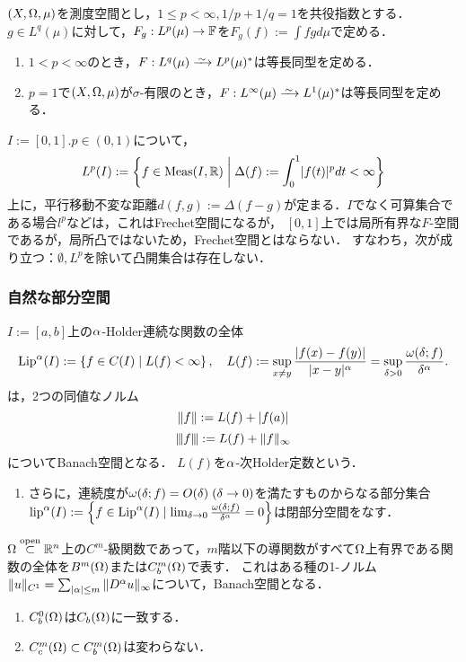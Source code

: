 \documentclass[uplatex,dvipdfmx]{jsreport}
\begin{document}
\begin{theorem}[$L^p$空間の描像]\label{thm-Lp-of-dual-spaces}
    $(X,\Omega,\mu)$を測度空間とし，$1\le p<\infty,1/p+1/q=1$を共役指数とする．
    $g\in L^q(\mu)$に対して，$F_g:L^p(\mu)\to\mathbb{F}$を$F_g(f):=\int fgd\mu$で定める．
    \begin{enumerate}
        \item $1<p<\infty$のとき，$F:L^q(\mu)\iso L^p(\mu)^*$は等長同型を定める．
        \item $p=1$で$(X,\Omega,\mu)$が$\sigma$-有限のとき，$F:L^\infty(\mu)\iso L^1(\mu)^*$は等長同型を定める．
    \end{enumerate}
\end{theorem}

\begin{example}
    $I:=[0,1].p\in(0,1)$について，
    \[L^p(I):=\left\{f\in\mathrm{Meas}(I,\mathbb{R})\;\middle|\;\Delta(f):=\int^1_0\lvert f(t)\rvert^pdt<\infty\right\}\]
    上に，平行移動不変な距離$d(f,g):=\Delta(f-g)$が定まる．$I$でなく可算集合である場合$l^p$などは，これはFrechet空間になるが，
    $[0,1]$上では局所有界な$F$-空間であるが，局所凸ではないため，Frechet空間とはならない．
    すなわち，次が成り立つ：$\emptyset,L^p$を除いて凸開集合は存在しない．
\end{example}

\subsubsection{自然な部分空間}

\begin{example}[Lipschitz空間]
    $I:=[a,b]$上の$\alpha$-Holder連続な関数の全体
    \[\mathrm{Lip}^\alpha(I):=\left\{f\in C(I)\mid L(f)<\infty\right\},\quad L(f):=\sup_{x\ne y}\frac{\lvert f(x)-f(y)\rvert}{\lvert x-y\rvert^\alpha}=\sup_{\delta>0}\frac{\omega(\delta;f)}{\delta^\alpha}.\]
    は，2つの同値なノルム
    \[\|f\|:=L(f)+\lvert f(a)\rvert\]
    \[{\left\vert\kern-0.25ex\left\vert\kern-0.25ex\left\vert f \right\vert\kern-0.25ex\right\vert\kern-0.25ex\right\vert}:=L(f)+\|f\|_\infty\]
    についてBanach空間となる．
    $L(f)$を$\alpha$-次Holder定数という．
    \begin{enumerate}
        \item さらに，連続度が$\omega(\delta;f)=O(\delta)\;(\delta\to0)$を満たすものからなる部分集合$\textrm{lip}^\alpha(I):=\left\{f\in\mathrm{Lip}^\alpha(I)\mid\lim_{\delta\to0}\frac{\omega(\delta;f)}{\delta^\alpha}=0\right\}$は閉部分空間をなす．
    \end{enumerate}
\end{example}

\begin{example}[導関数ノルムを備えたBanach空間]\label{exp-Banach-space-with-derivative-norm}
    $\Omega\overset{\mathrm{open}}{\subset}\mathbb{R}^n$上の$C^m$-級関数であって，$m$階以下の導関数がすべて$\Omega$上有界である関数の全体を$B^m(\Omega)$または$C_b^m(\Omega)$で表す．
    これはある種の1-ノルム$\|u\|_{C^1}=\sum_{\lvert\alpha\rvert\le m}\|D^\alpha u\|_\infty$について，Banach空間となる．
    \begin{enumerate}
        \item $C_b^0(\Omega)$は$C_b(\Omega)$に一致する．
        \item $C_c^m(\Omega)\subset C_b^m(\Omega)$は変わらない．
    \end{enumerate}
\end{example}
\end{document}
